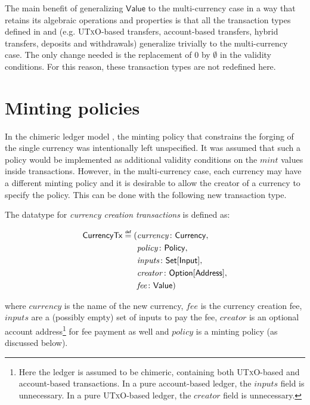 \documentclass{llncs}
\newcommand{\defeq}{\mathrel{\overset{\makebox[0pt]{\mbox{\normalfont\tiny\sffamily def}}}{=}}}
\newcommand{\utxo}{\textsc{UTxO}\xspace}
\newcommand{\type}[1]{\mathsf{#1}}
\newcommand{\setT}{\type{Set}}
\newcommand{\maybeT}{\type{Option}}
\newcommand{\currencyCreationT}{\type{CurrencyTx}}
\newcommand{\inputT}{\type{Input}}
\newcommand{\addressT}{\type{Address}}
\newcommand{\valueT}{\type{Value}}
\newcommand{\currencyT}{\type{Currency}}
\newcommand{\policyT}{\type{Policy}}
\newcommand{\field}[1]{\mathit{#1}}
\newcommand{\ins}{\field{inputs}}
\newcommand{\mint}{\field{mint}}
\newcommand{\fee}{\field{fee}}
\newcommand{\policy}{\field{policy}}
\newcommand{\creator}{\field{creator}}
\newcommand{\currency}{\field{currency}}
\newenvironment{smallish}{
	\begin{small}
}{
	\end{small}
}
\begin{document}
The main benefit of generalizing $\valueT$ to the multi-currency case in a way that retains its algebraic operations and properties is that all the transaction types defined in \cite{ChimericLedgers} and \cite{UTxOScripts} (e.g. \utxo-based transfers, account-based transfers, hybrid transfers, deposits and withdrawals) generalize trivially to the multi-currency case. The only change needed is the replacement of $0$ by $\emptyset$ in the validity conditions. For this reason, these transaction types are not redefined here.



\section{Minting policies}
\label{sec:MintingPolicy}

In the chimeric ledger model \cite{ChimericLedgers}, the minting policy that constrains the forging of the single currency was intentionally left unspecified. It was assumed that such a policy would be implemented as additional validity conditions on the $\mint$ values inside transactions.
However, in the multi-currency case, each currency may have a different minting policy and it is desirable to allow the creator of a currency to specify the policy. This can be done with the following new transaction type.

\begin{definition}
\label{def:CurrencyCreation}
The datatype for \emph{currency creation transactions} is defined as:
\begin{smallish}
\begin{equation*}
\begin{split}
\currencyCreationT \defeq (&\currency\colon \currencyT,\\& \policy\colon \policyT,\\& \ins\colon \setT[\inputT],\\& \creator\colon \maybeT[\addressT],\\& \fee\colon \valueT)
\end{split}
\end{equation*}
\end{smallish}
where $\currency$ is the name of the new currency, $\fee$ is the currency creation fee, $\ins$ are a (possibly empty) set of inputs to pay the fee, $\creator$ is an optional account address\footnote{Here the ledger is assumed to be chimeric, containing both \utxo-based and account-based transactions. In a pure account-based ledger, the $\ins$ field is unnecessary. In a pure \utxo-based ledger, the $\creator$ field is unnecessary.} for fee payment as well and $\policy$ is a minting policy (as discussed below).
\end{definition}
\end{document}
